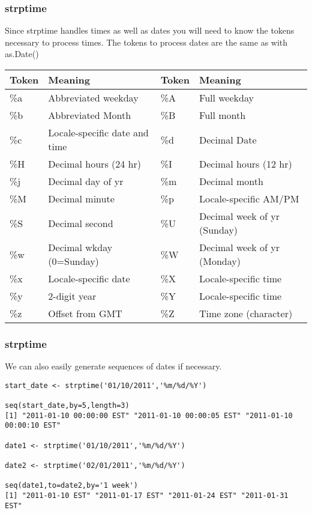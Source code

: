 \documentclass{beamer}
\begin{document}
\begin{frame}[fragile]
\frametitle{strptime}
Since strptime handles times as well as dates you will need to know the tokens necessary to process times. The tokens to process dates are the same as with as.Date()
\footnotesize

\begin{tabular}{| l | l || l | l |}
  \hline         
  Token & Meaning & Token & Meaning \\ \hline
  \%a & Abbreviated weekday & \%A & Full weekday \\ 
  \%b & Abbreviated Month & \%B & Full month \\ 
  \%c & Locale-specific date and time & \%d & Decimal Date \\
  \%H & Decimal hours (24 hr) & \%I & Decimal hours (12 hr) \\
  \%j & Decimal day of yr & \%m & Decimal month \\
  \%M & Decimal minute & \%p & Locale-specific AM/PM \\
  \%S & Decimal second & \%U & Decimal week of yr (Sunday) \\
  \%w & Decimal wkday (0=Sunday) & \%W & Decimal week of yr (Monday) \\
  \%x & Locale-specific date & \%X & Locale-specific time \\
  \%y & 2-digit year & \%Y & Locale-specific time \\
  \%z & Offset from GMT & \%Z & Time zone (character) \\ 
  \hline  
\end{tabular}
\end{frame}

\begin{frame}[fragile]
\frametitle{strptime}
We can also easily generate sequences of dates if necessary.
\newline
\scriptsize
\begin{verbatim}
start_date <- strptime('01/10/2011','%m/%d/%Y')

seq(start_date,by=5,length=3)
[1] "2011-01-10 00:00:00 EST" "2011-01-10 00:00:05 EST" "2011-01-10 00:00:10 EST"

date1 <- strptime('01/10/2011','%m/%d/%Y')

date2 <- strptime('02/01/2011','%m/%d/%Y')

seq(date1,to=date2,by='1 week')
[1] "2011-01-10 EST" "2011-01-17 EST" "2011-01-24 EST" "2011-01-31 EST"
 
\end{verbatim}
\end{frame}
\end{document}
